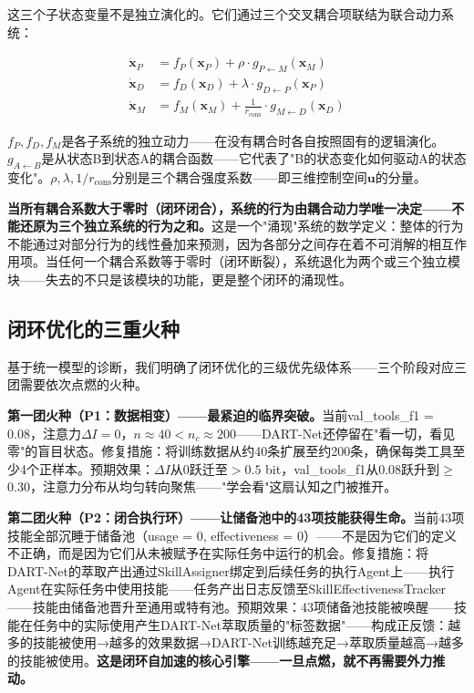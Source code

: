 \documentclass[twocolumn,10.5pt]{ctexart}
\begin{document}
这三个子状态变量不是独立演化的。它们通过三个交叉耦合项联结为联合动力系统：

\begin{align}
\dot{\mathbf{x}}_P &= f_P(\mathbf{x}_P) + \rho \cdot g_{P \leftarrow M}(\mathbf{x}_M) \label{eq:dot_P_passionate} \\
\dot{\mathbf{x}}_D &= f_D(\mathbf{x}_D) + \lambda \cdot g_{D \leftarrow P}(\mathbf{x}_P) \label{eq:dot_D_passionate} \\
\dot{\mathbf{x}}_M &= f_M(\mathbf{x}_M) + \frac{1}{r_{\text{cons}}} \cdot g_{M \leftarrow D}(\mathbf{x}_D) \label{eq:dot_M_passionate}
\end{align}

$f_P, f_D, f_M$是各子系统的独立动力——在没有耦合时各自按照固有的逻辑演化。$g_{A \leftarrow B}$是从状态B到状态A的耦合函数——它代表了"B的状态变化如何驱动A的状态变化"。$\rho, \lambda, 1/r_{\text{cons}}$分别是三个耦合强度系数——即三维控制空间$\mathbf{u}$的分量。

\textbf{当所有耦合系数大于零时（闭环闭合），系统的行为由耦合动力学唯一决定——不能还原为三个独立系统的行为之和。}这是一个"涌现"系统的数学定义：整体的行为不能通过对部分行为的线性叠加来预测，因为各部分之间存在着不可消解的相互作用项。当任何一个耦合系数等于零时（闭环断裂），系统退化为两个或三个独立模块——失去的不只是该模块的功能，更是整个闭环的涌现性。

\subsection{闭环优化的三重火种}

基于统一模型的诊断，我们明确了闭环优化的三级优先级体系——三个阶段对应三团需要依次点燃的火种。

\textbf{第一团火种（P1：数据相变）——最紧迫的临界突破。}当前val\_tools\_f1 = 0.08，注意力$\Delta I = 0$，$n \approx 40 < n_c \approx 200$——DART-Net还停留在"看一切，看见零"的盲目状态。修复措施：将训练数据从约40条扩展至约200条，确保每类工具至少4个正样本。预期效果：$\Delta I$从0跃迁至$>0.5$ bit，val\_tools\_f1从0.08跃升到$\geq$0.30，注意力分布从均匀转向聚焦——"学会看"这扇认知之门被推开。

\textbf{第二团火种（P2：闭合执行环）——让储备池中的43项技能获得生命。}当前43项技能全部沉睡于储备池（usage = 0, effectiveness = 0）——不是因为它们的定义不正确，而是因为它们从未被赋予在实际任务中运行的机会。修复措施：将DART-Net的萃取产出通过SkillAssigner绑定到后续任务的执行Agent上——执行Agent在实际任务中使用技能——任务产出日志反馈至SkillEffectivenessTracker——技能由储备池晋升至通用或特有池。预期效果：43项储备池技能被唤醒——技能在任务中的实际使用产生DART-Net萃取质量的"标签数据"——构成正反馈：越多的技能被使用→越多的效果数据→DART-Net训练越充足→萃取质量越高→越多的技能被使用。\textbf{这是闭环自加速的核心引擎——一旦点燃，就不再需要外力推动。}
\end{document}
